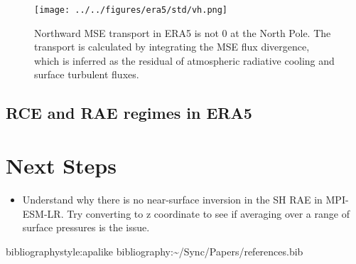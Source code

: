 \documentclass[11pt]{article}
\begin{document}
\begin{figure}[htbp]
\centering
\texttt{[image: ../../figures/era5/std/vh.png]}
\caption{\label{fig:org8d3d374}Northward MSE transport in ERA5 is not 0 at the North Pole. The transport is calculated by integrating the MSE flux divergence, which is inferred as the residual of atmospheric radiative cooling and surface turbulent fluxes.}
\end{figure}

\subsection{RCE and RAE regimes in ERA5}
\label{sec:orgfc70353}


\section{Next Steps}
\label{sec:org8b64c90}
\begin{itemize}
\item Understand why there is no near-surface inversion in the SH RAE in MPI-ESM-LR. Try converting to z coordinate to see if averaging over a range of surface pressures is the issue.
\end{itemize}

bibliographystyle:apalike
bibliography:\textasciitilde{}/Sync/Papers/references.bib
\end{document}
